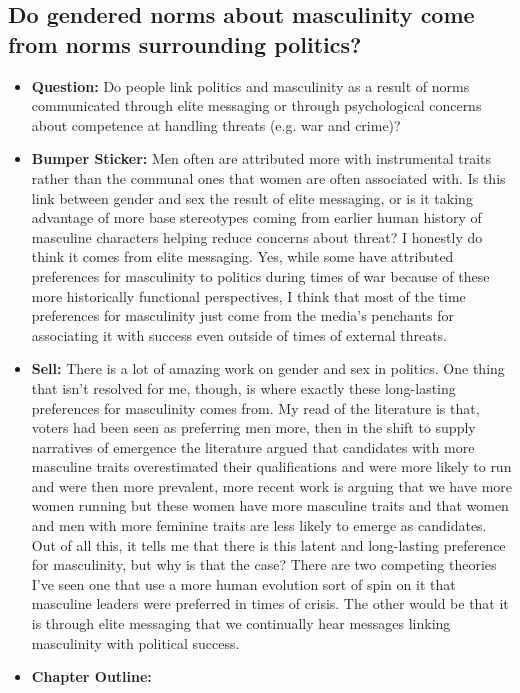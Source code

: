 \documentclass[12pt]{article}
\begin{document}
\subsection{Do gendered norms about masculinity come from norms surrounding politics?}
    \begin{itemize}
        \item \textbf{Question:} Do people link politics and masculinity as a result of norms communicated through elite messaging or through psychological concerns about competence at handling threats (e.g. war and crime)?
        \item \textbf{Bumper Sticker:} Men often are attributed more with instrumental traits rather than the communal ones that women are often associated with. Is this link between gender and sex the result of elite messaging, or is it taking advantage of more base stereotypes coming from  earlier human history of masculine characters helping reduce concerns about threat? I honestly do think it comes from elite messaging. Yes, while some have attributed preferences for masculinity to politics during times of war because of these more historically functional perspectives, I think that most of the time preferences for masculinity just come from the media's penchants for associating it with success even outside of times of external threats.
        \item \textbf{Sell:} There is a lot of amazing work on gender and sex in politics. One thing that isn't resolved for me, though, is where exactly these long-lasting preferences for masculinity comes from. My read of the literature is that, voters had been seen as preferring men more, then in the shift to supply narratives of emergence the literature argued that candidates with more masculine traits overestimated their qualifications and were more likely to run and were then more prevalent, more recent work is arguing that we have more women running but these women have more masculine traits and that women and men with more feminine traits are less likely to emerge as candidates. Out of all this, it tells me that there is this latent and long-lasting preference for masculinity, but why is that the case? There are two competing theories I've seen one that use a more human evolution sort of spin on it that masculine leaders were preferred in times of crisis. The other would be that it is through elite messaging that we continually hear messages linking masculinity with political success.
        \item \textbf{Chapter Outline:}
        \begin{enumerate}

\end{enumerate}
\end{itemize}
\end{document}
